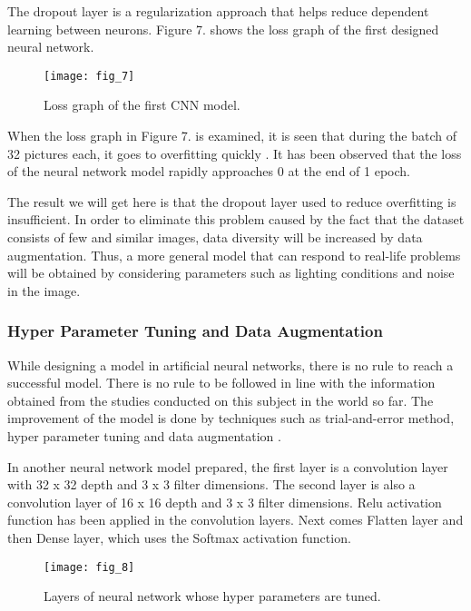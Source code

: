\documentclass[twocolumn, switch]{article} %
\begin{document}
The dropout layer is a regularization approach \cite{ciliberto2016consistent} that helps
reduce dependent learning between neurons. Figure 7. shows
the loss graph of the first designed neural network.

\begin{figure}[h]
    \centering
    \texttt{[image: fig\_7]}
    \caption{Loss graph of the first CNN model.}
    \label{fig:fig7}
\end{figure}

When the loss graph in Figure 7. is examined, it is seen that
during the batch of 32 pictures each, it goes to overfitting
quickly \cite{hawkins2004problem}. It has been observed that the loss of the neural
network model rapidly approaches 0 at the end of 1 epoch.

The result we will get here is that the dropout layer used to
reduce overfitting is insufficient. In order to eliminate this
problem caused by the fact that the dataset consists of few
and similar images, data diversity will be increased by data
augmentation. Thus, a more general model that can respond
to real-life problems will be obtained by considering
parameters such as lighting conditions and noise in the
image.

\subsubsection{Hyper Parameter Tuning and Data Augmentation}

While designing a model in artificial neural networks, there
is no rule to reach a successful model. There is no rule to be
followed in line with the information obtained from the
studies conducted on this subject in the world so far. The
improvement of the model is done by techniques such as
trial-and-error method, hyper parameter tuning \cite{bergstra2011algorithms} and data
augmentation \cite{mikolajczyk2018data}.

In another neural network model prepared, the first layer is a
convolution layer with 32 x 32 depth and 3 x 3 filter
dimensions. The second layer is also a convolution layer of
16 x 16 depth and 3 x 3 filter dimensions. Relu activation
function has been applied in the convolution layers. Next
comes Flatten layer and then Dense layer, which uses the
Softmax activation function.

\begin{figure}[h]
    \centering
    \texttt{[image: fig\_8]}
    \caption{Layers of neural network whose hyper parameters are
tuned.}
    \label{fig:fig8}
\end{figure}
\end{document}
